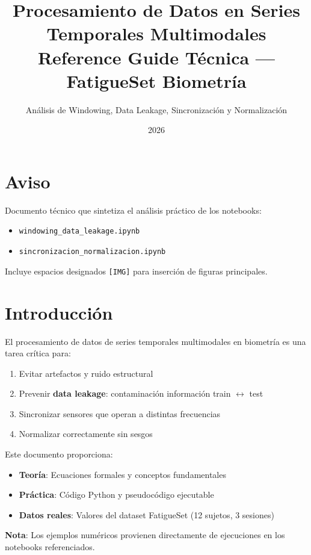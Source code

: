 \documentclass[11pt,twoside,a4paper]{article}
\title{\Large\textbf{Procesamiento de Datos en Series Temporales Multimodales} \\
       \normalsize Reference Guide Técnica --- FatigueSet Biometría}
\author{Análisis de Windowing, Data Leakage, Sincronización y Normalización}
\date{2026}
\newcommand{\code}[1]{\texttt{\small #1}}
\begin{document}
\maketitle

\section*{Aviso}
\noindent Documento técnico que sintetiza el análisis práctico de los notebooks:
\begin{itemize}
    \item \code{windowing\_data\_leakage.ipynb}
    \item \code{sincronizacion\_normalizacion.ipynb}
\end{itemize}
Incluye espacios designados \texttt{[IMG]} para inserción de figuras principales.

\newpage
\tableofcontents
\newpage

\section{Introducción}

El procesamiento de datos de series temporales multimodales en biometría es una tarea crítica para:
\begin{enumerate}
    \item Evitar artefactos y ruido estructural
    \item Prevenir \textbf{data leakage}: contaminación información train $\leftrightarrow$ test
    \item Sincronizar sensores que operan a distintas frecuencias
    \item Normalizar correctamente sin sesgos
\end{enumerate}

Este documento proporciona:
\begin{itemize}
    \item \textbf{Teoría}: Ecuaciones formales y conceptos fundamentales
    \item \textbf{Práctica}: Código Python y pseudocódigo ejecutable
    \item \textbf{Datos reales}: Valores del dataset FatigueSet (12 sujetos, 3 sesiones)
\end{itemize}

\noindent\textbf{Nota}: Los ejemplos numéricos provienen directamente de ejecuciones en los notebooks referenciados.
\end{document}
